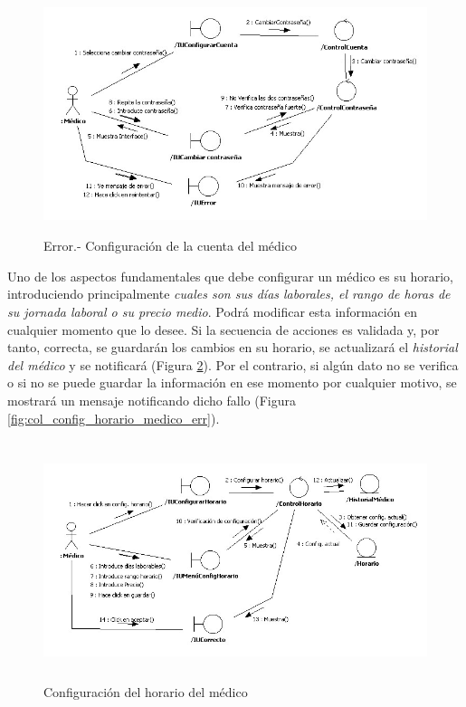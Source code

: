		\begin{figure}[H]
		  \centering
		    \includegraphics[height=7cm, width=16cm]{img/jpg/colaboraciones/5_ConfiguracionCuentaMedicoError.jpg}
		  \caption{Error.- Configuración de la cuenta del médico}
		  \label{fig:col_config_cuenta_medico_err}
		\end{figure}
		
		Uno de los aspectos fundamentales que debe configurar un médico es su horario, introduciendo principalmente \textit{cuales son sus días laborales, el rango de horas de su jornada laboral o su precio medio}. Podrá modificar esta información en cualquier momento que lo desee. Si la secuencia de acciones es validada y, por tanto, correcta, se guardarán los cambios en su horario, se actualizará el \textit{historial del médico} y se notificará (Figura \ref{fig:col_config_horario_medico}). Por el contrario, si algún dato no se verifica o si no se puede guardar la información en ese momento por cualquier motivo, se mostrará un mensaje notificando dicho fallo (Figura \ref{fig:col_config_horario_medico_err}).
		
		\begin{figure}[H]
		  \centering
		    \includegraphics[width=16cm, height=7cm]{img/jpg/colaboraciones/6_ConfiguracionHorarioMedico.jpg}
		  \caption{Configuración del horario del médico}
		  \label{fig:col_config_horario_medico}
		\end{figure}
		
